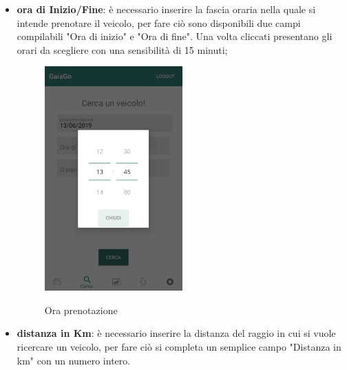 \begin{itemize}
 \item \textbf{ora di Inizio/Fine}: è necessario inserire la fascia oraria nella quale si intende prenotare il veicolo, per fare ciò sono disponibili due campi compilabili "Ora di inizio" e "Ora di fine". Una volta cliccati presentano gli orari da scegliere con una sensibilità di 15 minuti;
  \begin{figure}[H] 
 	\centering 
 	\includegraphics[width=0.5\textwidth]{res/images/ora_inizio.png}\\
 	\caption{Ora prenotazione}
 	\label{ora}
 \end{figure}
 
 \item \textbf{distanza in Km}: è necessario inserire la distanza del raggio in cui si vuole ricercare un veicolo, per fare ciò si completa un semplice campo "Distanza in km" con un numero intero.
\end{itemize}
\pagebreak

